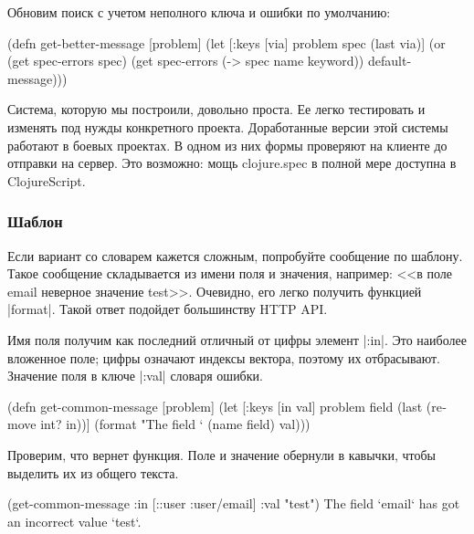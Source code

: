 \noindent
Обновим поиск с учетом неполного ключа и ошибки по умолчанию:

\begin{english}
  \begin{clojure}
(defn get-better-message
  [problem]
  (let [{:keys [via]} problem
        spec (last via)]
    (or (get spec-errors spec)
        (get spec-errors (-> spec name keyword))
        default-message)))
  \end{clojure}
\end{english}

Система, которую мы построили, довольно проста. Ее легко тестировать и изменять
под нужды конкретного проекта. Доработанные версии этой системы работают в
боевых проектах. В одном из них формы проверяют на клиенте до отправки на
сервер. Это возможно: мощь clojure.spec в полной мере доступна в ClojureScript.

\subsubsection{Шаблон}

Если вариант со словарем кажется сложным, попробуйте сообщение по шаблону. Такое
сообщение складывается из имени поля и значения, например: <<в поле email
неверное значение test>>.  Очевидно, его легко получить функцией
\spverb|format|. Такой ответ подойдет большинству HTTP API.

Имя поля получим как последний отличный от цифры элемент \spverb|:in|. Это
наиболее вложенное поле; цифры означают индексы вектора, поэтому их
отбрасывают. Значение поля в ключе \spverb|:val| словаря ошибки.

\begin{english}
  \begin{clojure}
(defn get-common-message [problem]
  (let [{:keys [in val]} problem
        field (last (remove int? in))]
    (format "The field `%
            (name field) val)))
  \end{clojure}
\end{english}

Проверим, что вернет функция. Поле и значение обернули в кавычки, чтобы выделить
их из общего текста.

\begin{english}
  \begin{clojure}
(get-common-message {:in [::user :user/email] :val "test"})
The field `email` has got an incorrect value `test`.
  \end{clojure}
\end{english}

